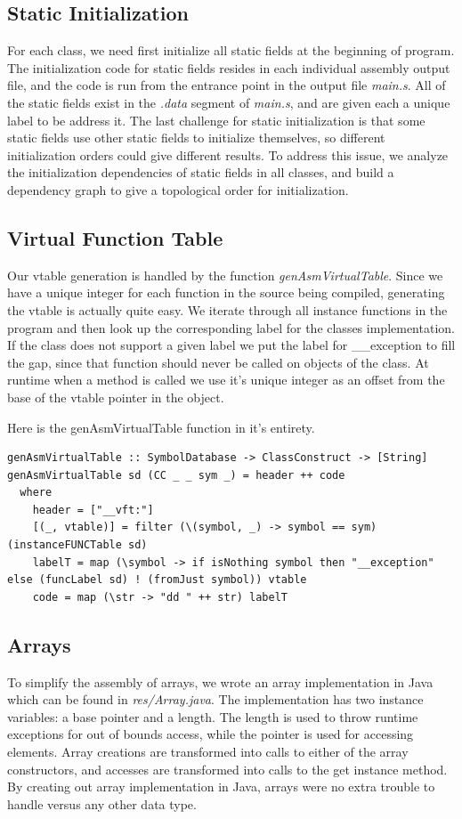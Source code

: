 \documentclass[12pt,letterpaper]{article}
\begin{document}
\subsection{Static Initialization}
For each class, we need first initialize all static fields at the beginning of program.
The initialization code for static fields resides in each individual assembly output file, and the code is run from the entrance point in the output file \emph{main.s}.
All of the static fields exist in the \emph{.data} segment of \emph{main.s}, and are given each a unique label to be address it.
The last challenge for static initialization is that some static fields use other static fields to initialize themselves, so different initialization orders could give different results.
To address this issue, we analyze the initialization dependencies of static fields in all classes, and build a dependency graph to give a topological order for initialization.

\subsection{Virtual Function Table}
Our vtable generation is handled by the function \emph{genAsmVirtualTable}.
Since we have a unique integer for each function in the source being compiled, generating the vtable is actually quite easy.
We iterate through all instance functions in the program and then look up the corresponding label for the classes implementation.
If the class does not support a given label we put the label for \_\_exception to fill the gap, since that function should never be called on objects of the class.
At runtime when a method is called we use it's unique integer as an offset from the base of the vtable pointer in the object.

Here is the genAsmVirtualTable function in it's entirety.
\begin{lstlisting}
genAsmVirtualTable :: SymbolDatabase -> ClassConstruct -> [String]
genAsmVirtualTable sd (CC _ _ sym _) = header ++ code
  where
    header = ["__vft:"]
    [(_, vtable)] = filter (\(symbol, _) -> symbol == sym) (instanceFUNCTable sd)
    labelT = map (\symbol -> if isNothing symbol then "__exception" else (funcLabel sd) ! (fromJust symbol)) vtable
    code = map (\str -> "dd " ++ str) labelT
\end{lstlisting}

\subsection{Arrays}
To simplify the assembly of arrays, we wrote an array implementation in Java which can be found in \emph{res/Array.java}.
The implementation has two instance variables: a base pointer and a length.
The length is used to throw runtime exceptions for out of bounds access, while the pointer is used for accessing elements.
Array creations are transformed into calls to either of the array constructors, and accesses are transformed into calls to the get instance method.
By creating out array implementation in Java, arrays were no extra trouble to handle versus any other data type.
\end{document}
